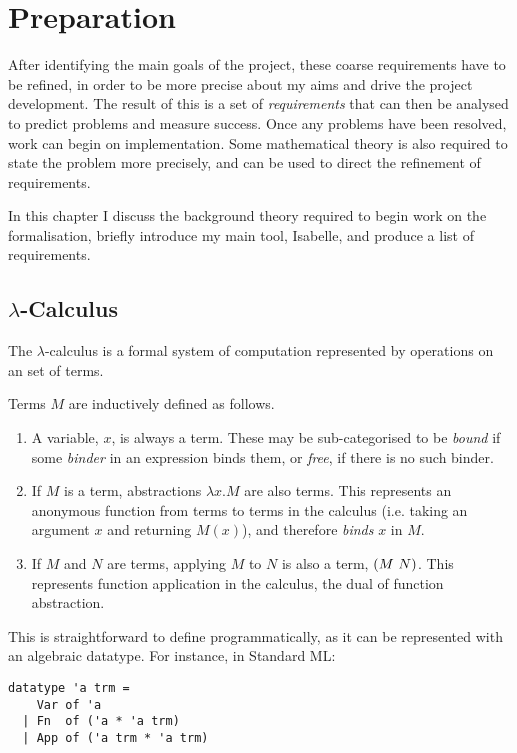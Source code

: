 \chapter{Preparation}
After identifying the main goals of the project, these coarse requirements have to be refined, in order to be more precise about my aims and drive the project development.
The result of this is a set of \emph{requirements} that can then be analysed to predict problems and measure success.
Once any problems have been resolved, work can begin on implementation.
Some mathematical theory is also required to state the problem more precisely, and can be used to direct the refinement of requirements.

In this chapter I discuss the background theory required to begin work on the formalisation, briefly introduce my main tool, Isabelle, and produce a list of requirements.

\section{\(\lambda\)-Calculus}
The \(\lambda\)-calculus\cite{lambda-overview} is a formal system of computation represented by operations on an set of terms.
\begin{definition}
Terms \(M\) are inductively defined as follows.
\begin{enumerate}
\item
A variable, \(x\), is always a term.
These may be sub-categorised to be \emph{bound} if some \emph{binder} in an expression binds them, or \emph{free}, if there is no such binder.
\item
If \(M\) is a term, abstractions \(\lambda x.M\) are also terms.
This represents an anonymous function from terms to terms in the calculus (i.e. taking an argument \(x\) and returning \(M(x)\)), and therefore \emph{binds} \(x\) in \(M\).
\item
If \(M\) and \(N\) are terms, applying \(M\) to \(N\) is also a term, \(\left(M\ N\right)\).
This represents function application in the calculus, the dual of function abstraction.
\end{enumerate}
\end{definition}

This is straightforward to define programmatically, as it can be represented with an algebraic datatype.
For instance, in Standard ML:
\begin{verbatim}
datatype 'a trm =
    Var of 'a
  | Fn  of ('a * 'a trm)
  | App of ('a trm * 'a trm)
\end{verbatim}

